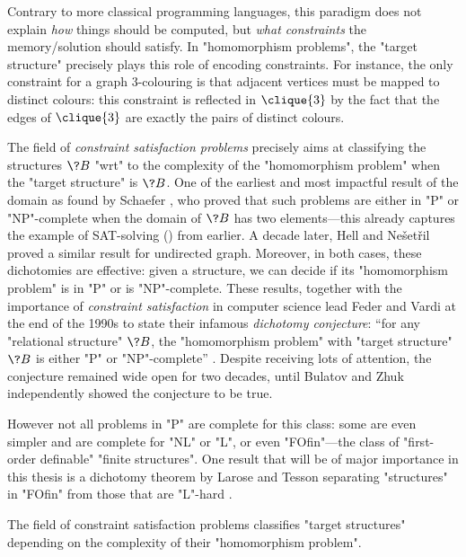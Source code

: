 Contrary to more classical programming languages, this paradigm does not explain \emph{how} things
should be computed, but \emph{what constraints} the memory/solution should satisfy.
In "homomorphism problems", the "target structure" precisely plays this role of
encoding constraints. For instance, the only constraint for a graph $3$-colouring is that
adjacent vertices must be mapped to distinct colours: this constraint is
reflected in $\clique{3}$ by the fact that the edges of $\clique{3}$ are exactly the pairs
of distinct colours.

The field of \emph{constraint satisfaction problems} precisely aims at classifying the
structures $\?B$ "wrt" to the complexity of the "homomorphism problem" when the
"target structure" is $\?B$. One of the earliest and most impactful result
of the domain as found by Schaefer \cite{Schaefer1978ComplexitySatisfiability},
who proved that such problems are either in "P" or "NP"-complete when the domain of $\?B$
has two elements---this already captures the example of SAT-solving () from earlier.
A decade later, Hell and Ne\v{s}et\v{r}il \cite{HellNesetril1990ComplexityColoring}
proved a similar result for undirected graph.
Moreover, in both cases, these dichotomies are effective: given a structure, we can decide if
its "homomorphism problem" is in "P" or is "NP"-complete.
These results, together with the importance of \emph{constraint satisfaction} in computer science
lead Feder and Vardi at the end of the 1990s
to state their infamous \emph{dichotomy conjecture}: ``for any "relational structure" $\?B$,
the "homomorphism problem" with "target structure" $\?B$ is either "P"
or "NP"-complete'' \cite{FederVardi1998ComputationalStructure}.
Despite receiving lots of attention, the conjecture remained wide open for two decades, until
Bulatov \cite{Bulatov2017DichotomyCSPs} and Zhuk \cite{Zhuk2020CSPDichotomy} independently
showed the conjecture to be true.

However not all problems in "P" are complete for this class: some are even simpler and are complete
for "NL" or "L", or even "FOfin"---the class of "first-order definable" "finite structures".
One result that will be of major importance in this thesis is a dichotomy
theorem by Larose and Tesson separating "structures" in "FOfin" from those that are "L"-hard
\cite{LaroseTesson2009UniversalAlgebraCSP}.

\begin{known}
	The field of constraint satisfaction problems classifies "target structures"
	depending on the complexity of their "homomorphism problem".
\end{known}

